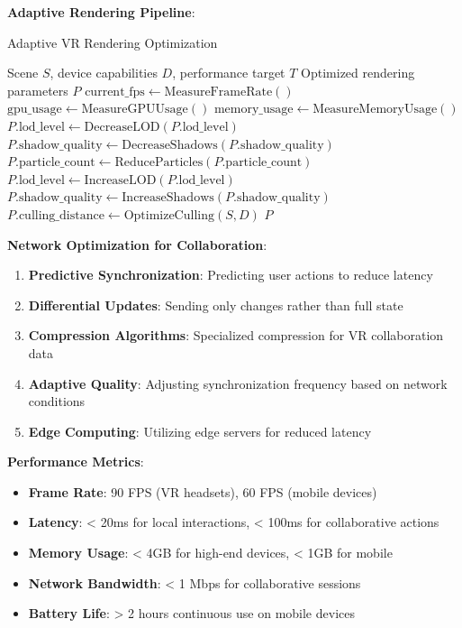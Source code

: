 \documentclass[10pt,twocolumn]{article}
\begin{document}
\textbf{Adaptive Rendering Pipeline}:

\begin{algorithm}[H]
\caption{Adaptive VR Rendering Optimization}
\label{alg:adaptive_rendering}
\begin{algorithmic}[1]
\REQUIRE Scene $S$, device capabilities $D$, performance target $T$
\ENSURE Optimized rendering parameters $P$
\STATE $\text{current\_fps} \leftarrow \text{MeasureFrameRate}()$
\STATE $\text{gpu\_usage} \leftarrow \text{MeasureGPUUsage}()$
\STATE $\text{memory\_usage} \leftarrow \text{MeasureMemoryUsage}()$
    \STATE $P.\text{lod\_level} \leftarrow \text{DecreaseLOD}(P.\text{lod\_level})$
    \STATE $P.\text{shadow\_quality} \leftarrow \text{DecreaseShadows}(P.\text{shadow\_quality})$
    \STATE $P.\text{particle\_count} \leftarrow \text{ReduceParticles}(P.\text{particle\_count})$
    \STATE $P.\text{lod\_level} \leftarrow \text{IncreaseLOD}(P.\text{lod\_level})$
    \STATE $P.\text{shadow\_quality} \leftarrow \text{IncreaseShadows}(P.\text{shadow\_quality})$
\ENDIF
\STATE $P.\text{culling\_distance} \leftarrow \text{OptimizeCulling}(S, D)$
\RETURN $P$
\end{algorithmic}
\end{algorithm}

\textbf{Network Optimization for Collaboration}:

\begin{enumerate}
    \item \textbf{Predictive Synchronization}: Predicting user actions to reduce latency
    \item \textbf{Differential Updates}: Sending only changes rather than full state
    \item \textbf{Compression Algorithms}: Specialized compression for VR collaboration data
    \item \textbf{Adaptive Quality}: Adjusting synchronization frequency based on network conditions
    \item \textbf{Edge Computing}: Utilizing edge servers for reduced latency
\end{enumerate}

\textbf{Performance Metrics}:
\begin{itemize}
    \item \textbf{Frame Rate}: 90 FPS (VR headsets), 60 FPS (mobile devices)
    \item \textbf{Latency}: < 20ms for local interactions, < 100ms for collaborative actions
    \item \textbf{Memory Usage}: < 4GB for high-end devices, < 1GB for mobile
    \item \textbf{Network Bandwidth}: < 1 Mbps for collaborative sessions
    \item \textbf{Battery Life}: > 2 hours continuous use on mobile devices
\end{itemize}
\end{document}
